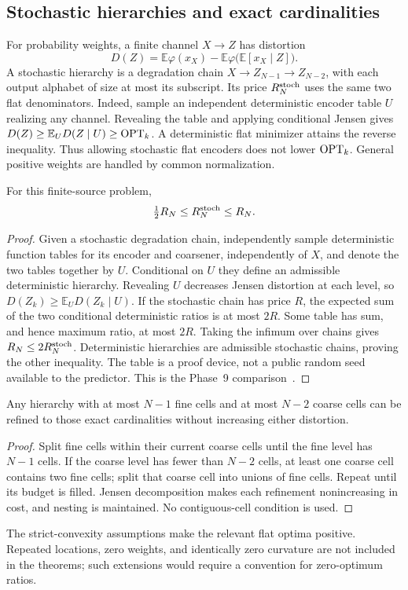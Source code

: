 \subsection{Stochastic hierarchies and exact cardinalities}
For probability weights, a finite channel $X\to Z$ has distortion
\[
 D(Z)=\mathbb E\varphi(x_X)
       -\mathbb E\varphi\bigl(\mathbb E[x_X\mid Z]\bigr).
\]
A stochastic hierarchy is a degradation chain
$X\to Z_{N-1}\to Z_{N-2}$, with each output alphabet of size at most its
subscript. Its price $R_N^{\mathrm{stoch}}$ uses the same two flat denominators.
Indeed, sample an independent deterministic encoder table $U$ realizing
any channel. Revealing the table and applying conditional Jensen gives
$D(Z)\ge\mathbb E_U D(Z\mid U)\ge\operatorname{OPT}_k$. A deterministic flat minimizer
attains the reverse inequality. Thus allowing stochastic flat encoders
does not lower $\operatorname{OPT}_k$. General positive weights are handled by common
normalization.

\begin{lemma}
\label{lem:ext-rounding}
For this finite-source problem,
\[
 \tfrac12 R_N\le R_N^{\mathrm{stoch}}\le R_N.
\]
\end{lemma}
\begin{proof}
Given a stochastic degradation chain, independently sample deterministic
function tables for its encoder and coarsener, independently of $X$, and
denote the two tables together by $U$. Conditional on $U$ they define an
admissible deterministic hierarchy. Revealing $U$ decreases Jensen
distortion at each level, so $D(Z_k)\ge\mathbb E_U D(Z_k\mid U)$.
If the stochastic chain has price $R$, the expected sum of the two
conditional deterministic ratios is at most $2R$. Some table has sum,
and hence maximum ratio, at most $2R$. Taking the infimum over chains
gives $R_N\le2R_N^{\mathrm{stoch}}$. Deterministic hierarchies are admissible
stochastic chains, proving the other inequality. The table is a proof
device, not a public random seed available to the predictor. This is the
Phase~9 comparison~\cite{huang9}.
\end{proof}

\begin{lemma}
\label{lem:exact-budgets}
Any hierarchy with at most $N-1$ fine cells and at most $N-2$ coarse
cells can be refined to those exact cardinalities without increasing
either distortion.
\end{lemma}
\begin{proof}
Split fine cells within their current coarse cells until the fine level
has $N-1$ cells. If the coarse level has fewer than $N-2$ cells, at least
one coarse cell contains two fine cells; split that coarse cell into
unions of fine cells. Repeat until its budget is filled. Jensen
decomposition makes each refinement nonincreasing in cost, and nesting
is maintained. No contiguous-cell condition is used.
\end{proof}
The strict-convexity assumptions make the relevant flat optima positive.
Repeated locations, zero weights, and identically zero curvature are not
included in the theorems; such extensions would require a convention for
zero-optimum ratios.
